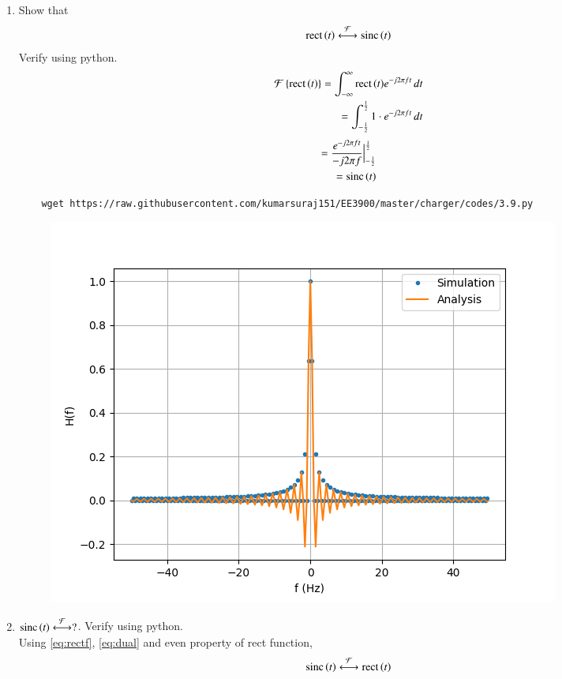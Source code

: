 \documentclass[journal,12pt,twocolumn]{IEEEtran}
\renewcommand\thesection{\arabic{section}}
\begin{document}
\begin{enumerate}[label=\thesection.\arabic*
,ref=\thesection.\theenumi]
\begin{figure}[!ht]
    \caption{}
\end{figure}
 \item Show that 
 \begin{align}
	 \text{rect}\left(t\right) \overset{\mathcal{F}}{ \longleftrightarrow} \text{sinc}\left(t\right)
 \end{align}
 Verify using python.\\
 \solution
 \begin{align}
  \mathcal{F}\left\{\text{rect}\left(t\right)\right\}=\int_{-\infty}^{\infty}{\text{rect}\left(t\right)}e^{-j2\pi ft}\,dt\\
  =\int_{-\frac{1}{2}}^{\frac{1}{2}}1\cdot e^{-j2\pi ft}\,dt
\end{align}
\begin{align}
  =\frac{e^{-j2\pi ft}}{-j2\pi f}\Big |_{-\frac{1}{2}}^{\frac{1}{2}}\\
 \label{eq:rectf}
  =\text{sinc}\left(t\right)
  \end{align}
  \begin{lstlisting}
    wget https://raw.githubusercontent.com/kumarsuraj151/EE3900/master/charger/codes/3.9.py 
  \end{lstlisting}
  \begin{figure}[!ht]
    \centering
    \includegraphics[width=\columnwidth]{./figs/3.9}
    \caption{}
\end{figure}
 \item 
$	 \text{sinc}\left(t\right)\overset{\mathcal{F}}{ \longleftrightarrow} ?$.  Verify using python.\\
\solution
Using \eqref{eq:rectf}, \eqref{eq:dual} and even property of rect function,
\begin{align}
\label{eq:sinc}
\text{sinc}\left(t\right)\overset{\mathcal{F}}{ \longleftrightarrow}\text{rect}\left(t\right)
\end{align}

\end{enumerate}
\end{document}
